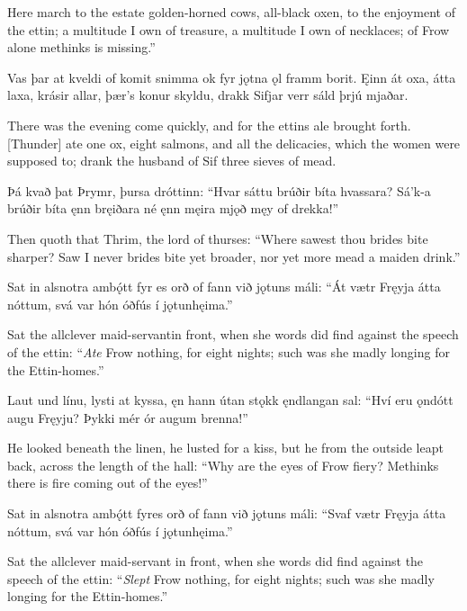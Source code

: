 Here march to the estate golden-horned cows, all-black oxen, to the enjoyment of the ettin; a multitude I own of treasure, a multitude I own of necklaces; of Frow alone methinks is missing.”

Vas þar at kveldi \hld of komit snimma
ok fyr jǫtna \hld ǫl framm borit.
Ęinn át oxa, \hld átta laxa,
krásir allar, \hld þær’s konur skyldu,
drakk Sifjar verr \hld sáld þrjú mjaðar. 

There was the evening come quickly, and for the ettins ale brought forth. [Thunder] ate one ox, eight salmons, and all the delicacies, which the women were supposed to; drank the husband of Sif three sieves of mead.

Þá kvað þat Þrymr, \hld þursa dróttinn:
“Hvar sáttu brúðir \hld bíta hvassara?
Sá’k-a brúðir \hld bíta ęnn bręiðara
né ęnn męira mjǫð \hld męy of drekka!”

Then quoth that Thrim, the lord of thurses: “Where sawest thou brides bite sharper? Saw I never brides bite yet broader, nor yet more mead a maiden drink.”

Sat in alsnotra \hld ambǫ́tt fyr
es orð of fann \hld við jǫtuns máli:
“Át vætr Fręyja \hld átta nóttum,
svá var hón óðfús \hld í jǫtunhęima.”

Sat the allclever maid-servant\footnotemark[1] in front, when she words did find against the speech of the ettin: “\emph{Ate} Frow nothing, for eight nights; such was she madly longing for the Ettin-homes.”

Laut und línu, \hld lysti at kyssa,
ęn hann útan stǫkk \hld ęndlangan sal:
“Hví eru ǫndótt \hld augu Fręyju?
Þykki mér ór \hld augum brenna!”

He looked beneath the linen, he lusted for a kiss, but he from the outside leapt back, across the length of the hall: “Why are the eyes of Frow fiery? Methinks there is fire coming out of the eyes!\footnotemark[1]”

Sat in alsnotra \hld ambǫ́tt fyr\footnotemark[1]
es orð of fann \hld við jǫtuns máli:
“Svaf vætr Fręyja \hld átta nóttum,
svá var hón óðfús \hld í jǫtunhęima.”

Sat the allclever maid-servant in front, when she words did find against the speech of the ettin: “\emph{Slept} Frow nothing, for eight nights; such was she madly longing for the Ettin-homes.”

